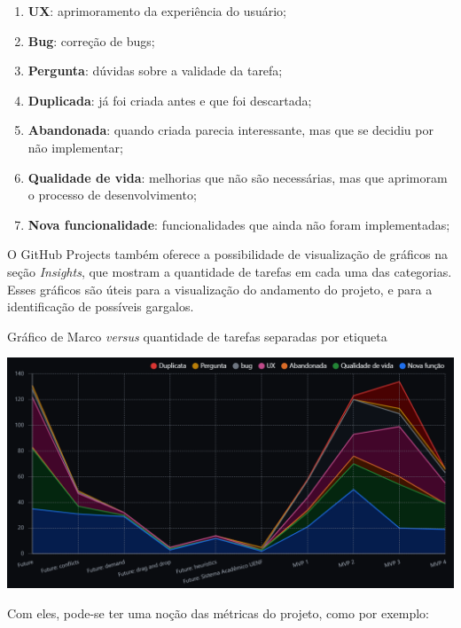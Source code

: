 \begin{enumerate}
  \item \textbf{UX}: aprimoramento da experiência do usuário;
  \item \textbf{Bug}: correção de bugs;
  \item \textbf{Pergunta}: dúvidas sobre a validade da tarefa;
  \item \textbf{Duplicada}: já foi criada antes e que foi descartada;
  \item \textbf{Abandonada}: quando criada parecia interessante, mas que se decidiu por não implementar;
  \item \textbf{Qualidade de vida}: melhorias que não são necessárias, mas que aprimoram o processo de desenvolvimento;
  \item \textbf{Nova funcionalidade}: funcionalidades que ainda não foram implementadas;
\end{enumerate}

 \label{ssssec:Gráficos}

O GitHub Projects também oferece a possibilidade de visualização de gráficos na seção \textit{Insights}, que mostram a quantidade de tarefas em cada uma das categorias. Esses gráficos são úteis para a visualização do andamento do projeto, e para a identificação de possíveis gargalos.

\begin{MyCenteredFigure} \caption{Gráfico de Marco \textit{versus} quantidade de tarefas separadas por etiqueta} \label{fig:ProjectsInsights}
  \includegraphics[width=\textwidth]{files/img/2.02!5-desenvolvimento/2.02!5.1.4-sistema/GitHub Projects/GitHubProjects-Insights-Stacked_Line-Milestone_Label}
\end{MyCenteredFigure}

Com eles, pode-se ter uma noção das métricas do projeto, como por exemplo:

